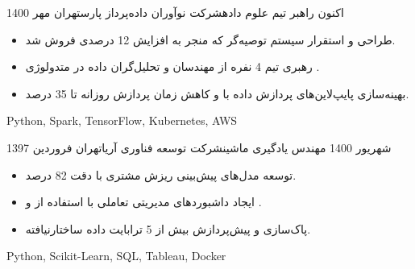 \begin{experiences}
  \experience
    {اکنون}   {راهبر تیم علوم داده}{شرکت نوآوران داده‌پرداز پارس}{تهران}
    {مهر 1400} {
      \begin{itemize}
        \item طراحی و استقرار سیستم توصیه‌گر  که منجر به افزایش  12 درصدی فروش شد.
        \item رهبری تیم 4 نفره از مهندسان و تحلیل‌گران داده در متدولوژی .
        \item بهینه‌سازی پایپ‌لاین‌های پردازش داده با  و کاهش زمان پردازش روزانه تا 35 درصد.
      \end{itemize}
    }
    {Python, Spark, TensorFlow, Kubernetes, AWS}
  \emptySeparator
  
  \experience
    {شهریور 1400} {مهندس یادگیری ماشین}{شرکت توسعه فناوری آریا}{تهران}
    {فروردین 1397} {
      \begin{itemize}
        \item توسعه مدل‌های پیش‌بینی ریزش مشتری  با دقت 82 درصد.
        \item ایجاد داشبوردهای مدیریتی تعاملی با استفاده از  و .
        \item پاک‌سازی و پیش‌پردازش بیش از 5 ترابایت داده ساختارنیافته.
      \end{itemize}
    }
    {Python, Scikit-Learn, SQL, Tableau, Docker}
\end{experiences}


